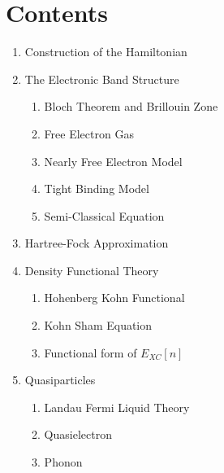 \documentclass{article}
\begin{document}
\section*{Contents}
\begin{enumerate}
	\item Construction of the Hamiltonian
	\item The Electronic Band Structure
	      \begin{enumerate}
		      \item Bloch Theorem and Brillouin Zone
		      \item Free Electron Gas
		      \item Nearly Free Electron Model
		      \item Tight Binding Model
		      \item Semi-Classical Equation
	      \end{enumerate}
	\item Hartree-Fock Approximation
	\item Density Functional Theory
	      \begin{enumerate}
		      \item Hohenberg Kohn Functional
		      \item Kohn Sham Equation
		      \item Functional form of $E_{XC}[n]$
	      \end{enumerate}
	\item Quasiparticles
	      \begin{enumerate}
		      \item Landau Fermi Liquid Theory
		      \item Quasielectron
		      \item Phonon
	      \end{enumerate}
\end{enumerate}
\end{document}
